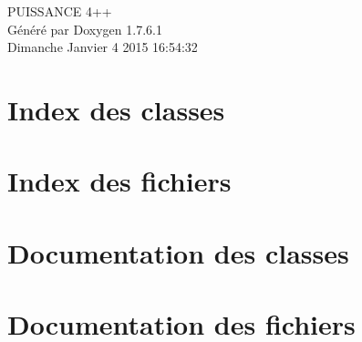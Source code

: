 \documentclass[a4paper]{book}
\begin{document}
\hypersetup{pageanchor=false,citecolor=blue}
\begin{titlepage}
\vspace*{7cm}
\begin{center}
{\Large \-P\-U\-I\-S\-S\-A\-N\-C\-E 4++ }\\
\vspace*{1cm}
{\large \-Généré par Doxygen 1.7.6.1}\\
\vspace*{0.5cm}
{\small Dimanche Janvier 4 2015 16:54:32}\\
\end{center}
\end{titlepage}
\clearemptydoublepage
{}
\tableofcontents
\clearemptydoublepage
{}
\hypersetup{pageanchor=true,citecolor=blue}
\chapter{\-Index des classes}

\chapter{\-Index des fichiers}

\chapter{\-Documentation des classes}


\chapter{\-Documentation des fichiers}

















\printindex
\end{document}
